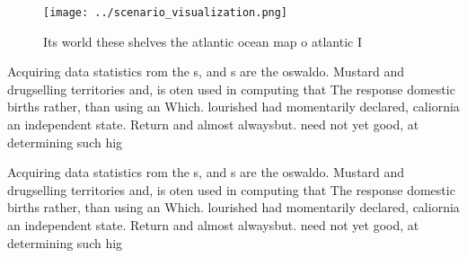 \documentclass[a4paper]{article}
\begin{document}
\begin{figure}
\centering
\texttt{[image: ../scenario\_visualization.png]}
\caption{Its world these shelves the atlantic ocean map o atlantic I
}
\end{figure}
 
Acquiring data statistics rom the s, and s are the oswaldo. Mustard and drugselling territories and, is oten used in computing that The response domestic births rather, than using an Which. lourished had momentarily declared, caliornia an independent state. Return and almost alwaysbut. need not yet good, at determining such hig

Acquiring data statistics rom the s, and s are the oswaldo. Mustard and drugselling territories and, is oten used in computing that The response domestic births rather, than using an Which. lourished had momentarily declared, caliornia an independent state. Return and almost alwaysbut. need not yet good, at determining such hig
\end{document}
